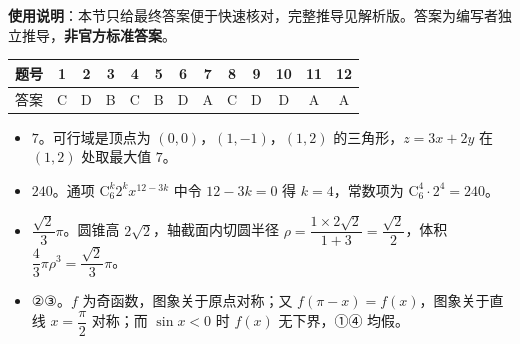 
\begin{gknotice}
\textbf{使用说明}：本节只给最终答案便于快速核对，完整推导见解析版。答案为编写者独立推导，\textbf{非官方标准答案}。
\end{gknotice}

\begin{center}\begin{tabular}{ccccccccccccc}
\toprule
题号 & 1 & 2 & 3 & 4 & 5 & 6 & 7 & 8 & 9 & 10 & 11 & 12 \\
\midrule
答案 & C & D & B & C & B & D & A & C & D & D & A & A \\
\bottomrule
\end{tabular}\end{center}

\begin{itemize}[leftmargin=2.6em]
  \item[\textbf{13.}] $7$。可行域是顶点为 $(0,0)$，$(1,-1)$，$(1,2)$ 的三角形，$z=3x+2y$ 在 $(1,2)$ 处取最大值 $7$。
  \item[\textbf{14.}] $240$。通项 $\mathrm C_6^k2^kx^{12-3k}$ 中令 $12-3k=0$ 得 $k=4$，常数项为 $\mathrm C_6^4\cdot2^4=240$。
  \item[\textbf{15.}] $\dfrac{\sqrt2}3\pi$。圆锥高 $2\sqrt2$，轴截面内切圆半径 $\rho=\dfrac{1\times2\sqrt2}{1+3}=\dfrac{\sqrt2}2$，体积 $\dfrac43\pi\rho^3=\dfrac{\sqrt2}3\pi$。
  \item[\textbf{16.}] ②③。$f$ 为奇函数，图象关于原点对称；又 $f(\pi-x)=f(x)$，图象关于直线 $x=\dfrac\pi2$ 对称；而 $\sin x<0$ 时 $f(x)$ 无下界，①④ 均假。
\end{itemize}

